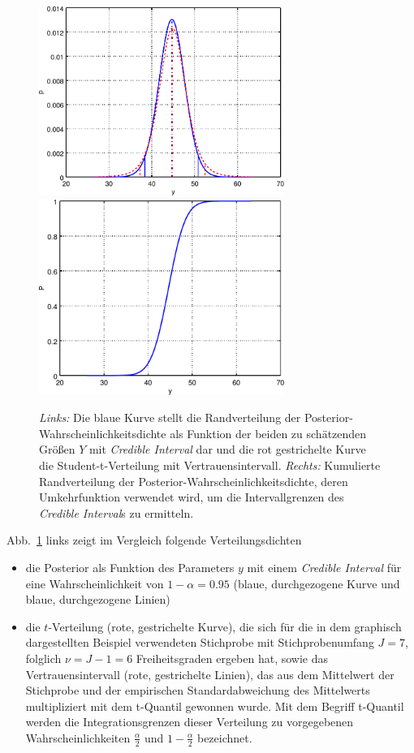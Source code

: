\begin{figure}
\begin{center}
\includegraphics[width=80mm]{04_vorlesung/media/understand_bayes_mean_posteriormarginal.pdf}
\hspace{5mm}
\includegraphics[width=80mm]{04_vorlesung/media/understand_bayes_mean_cumposterior.pdf}
\caption{\label{posteriorCredible}\textsl{Links:} Die blaue Kurve stellt die
Randverteilung der Posterior-Wahrscheinlichkeitsdichte als Funktion
der beiden zu schätzenden Größen $Y$ mit \textsl{Credible Interval} dar und die
rot gestrichelte Kurve die Student-t-Verteilung mit Vertrauensintervall.
\textsl{Rechts:} Kumulierte Randverteilung der Posterior-Wahrscheinlichkeitsdichte, deren
Umkehrfunktion verwendet wird, um die Intervallgrenzen des \textsl{Credible Interval}s zu ermitteln.}
\end{center}
\end{figure}
Abb.~\ref{posteriorCredible} links zeigt im Vergleich folgende Verteilungsdichten
\begin{itemize}
\item die Posterior als Funktion des Parameters
$y$ mit einem \textsl{Credible Interval} für eine Wahrscheinlichkeit von
$1 - \alpha = 0.95$ (blaue, durchgezogene Kurve und blaue, durchgezogene Linien)
\item die $t$-Verteilung (rote, gestrichelte Kurve), die sich für die in dem
graphisch dargestellten Beispiel verwendeten Stichprobe mit Stichprobenumfang $J = 7$, folglich
$\nu = J - 1 = 6$ Freiheitsgraden ergeben hat, sowie das Vertrauensintervall (rote, gestrichelte Linien),
das aus dem Mittelwert der Stichprobe
und der empirischen Standardabweichung des Mittelwerts multipliziert mit dem
t-Quantil gewonnen wurde. Mit dem Begriff t-Quantil werden die Integrationsgrenzen dieser Verteilung
zu vorgegebenen Wahrscheinlichkeiten $\frac{\alpha}{2}$ und $1 - \frac{\alpha}{2}$ bezeichnet.
\end{itemize}

